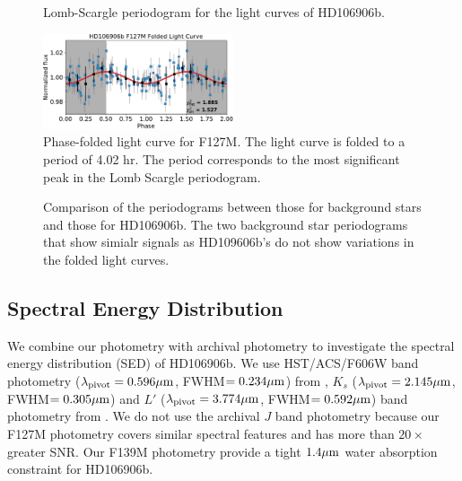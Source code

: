 \documentclass[twocolumn]{aastex62}
\begin{document}
\begin{figure}
  \centering
  \caption{Lomb-Scargle periodogram for the light curves of HD106906b. }
  \label{fig:periodogram}
\end{figure}

\begin{figure}
  \centering
  \includegraphics[width=0.5\textwidth]{figures/F127M_foldedLC.pdf}
  \caption{Phase-folded light curve for F127M. The light curve is folded to a period of 4.02 hr. The period corresponds to the most significant peak in the Lomb Scargle periodogram.}
  \label{fig:fold}
\end{figure}

\begin{figure}
  \centering
  \caption{Comparison of the periodograms between those for background stars and those for HD106906b. The two background star periodograms that show simialr signals as HD109606b's do not show variations in the folded light curves.}
  \label{fig:all-periodograms}
\end{figure}


\subsection{Spectral Energy Distribution}
We combine our photometry with archival photometry  to investigate the spectral energy distribution (SED) of HD106906b.  We use HST/ACS/F606W band photometry ($\lambda_{\mathrm{pivot}}=0.596\mbox{$\mu$m}$, FWHM$=0.234\mbox{$\mu$m}$) from \citet{Kalas2015}, $K_{s}$ ($\lambda_{\mathrm{pivot}}=2.145\mbox{$\mu$m}$, FWHM$=0.305\mbox{$\mu$m}$) and $L'$ ($\lambda_{\mathrm{pivot}}=3.774\mbox{$\mu$m}$, FWHM$=0.592\mbox{$\mu$m}$) band photometry from \citet{Bailey2013}. We do not use the archival $J$ band photometry \citep{Wu2016} because our F127M photometry covers similar spectral features and has more than $20\times$ greater SNR. Our F139M photometry provide a tight $1.4\mbox{$\mu$m}$ water absorption constraint for HD106906b.
\end{document}
